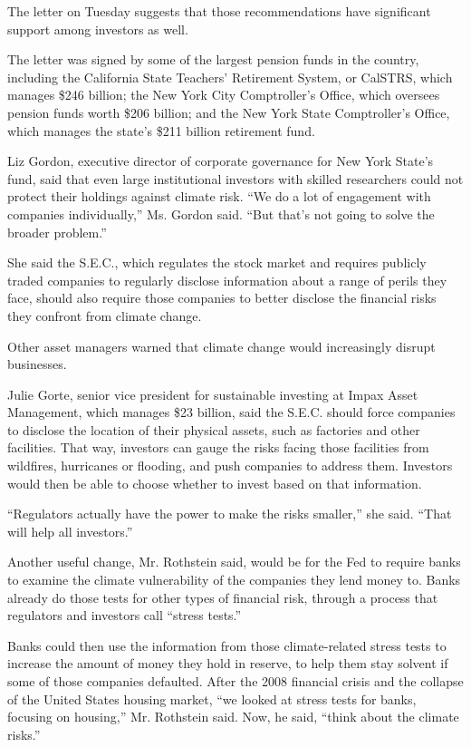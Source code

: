 The letter on Tuesday suggests that those recommendations have
significant support among investors as well.

The letter was signed by some of the largest pension funds in the
country, including the California State Teachers' Retirement System, or
CalSTRS, which manages \$246 billion; the New York City Comptroller's
Office, which oversees pension funds worth \$206 billion; and the New
York State Comptroller's Office, which manages the state's \$211 billion
retirement fund.

Liz Gordon, executive director of corporate governance for New York
State's fund, said that even large institutional investors with skilled
researchers could not protect their holdings against climate risk. ``We
do a lot of engagement with companies individually,'' Ms. Gordon said.
``But that's not going to solve the broader problem.''

She said the S.E.C., which regulates the stock market and requires
publicly traded companies to regularly disclose information about a
range of perils they face, should also require those companies to better
disclose the financial risks they confront from climate change.

Other asset managers warned that climate change would increasingly
disrupt businesses.

Julie Gorte, senior vice president for sustainable investing at Impax
Asset Management, which manages \$23 billion, said the S.E.C. should
force companies to disclose the location of their physical assets, such
as factories and other facilities. That way, investors can gauge the
risks facing those facilities from wildfires, hurricanes or flooding,
and push companies to address them. Investors would then be able to
choose whether to invest based on that information.

``Regulators actually have the power to make the risks smaller,'' she
said. ``That will help all investors.''

Another useful change, Mr. Rothstein said, would be for the Fed to
require banks to examine the climate vulnerability of the companies they
lend money to. Banks already do those tests for other types of financial
risk, through a process that regulators and investors call ``stress
tests.''

Banks could then use the information from those climate-related stress
tests to increase the amount of money they hold in reserve, to help them
stay solvent if some of those companies defaulted. After the 2008
financial crisis and the collapse of the United States housing market,
``we looked at stress tests for banks, focusing on housing,'' Mr.
Rothstein said. Now, he said, ``think about the climate risks.''

